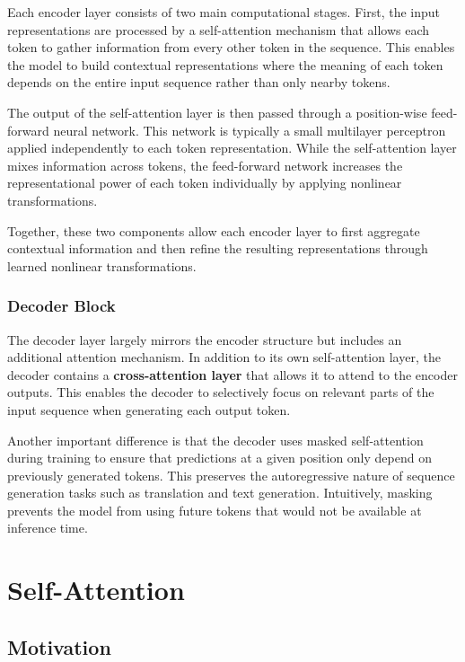 \documentclass[11pt]{article}
\begin{document}
Each encoder layer consists of two main computational stages. First, the input representations are processed by a self-attention mechanism that allows each token to gather information from every other token in the sequence. This enables the model to build contextual representations where the meaning of each token depends on the entire input sequence rather than only nearby tokens.

The output of the self-attention layer is then passed through a position-wise feed-forward neural network. This network is typically a small multilayer perceptron applied independently to each token representation. While the self-attention layer mixes information across tokens, the feed-forward network increases the representational power of each token individually by applying nonlinear transformations.

Together, these two components allow each encoder layer to first aggregate contextual information and then refine the resulting representations through learned nonlinear transformations.

\subsubsection{Decoder Block}

The decoder layer largely mirrors the encoder structure but includes an additional attention mechanism. In addition to its own self-attention layer, the decoder contains a \textbf{cross-attention layer} that allows it to attend to the encoder outputs. This enables the decoder to selectively focus on relevant parts of the input sequence when generating each output token.

Another important difference is that the decoder uses masked self-attention during training to ensure that predictions at a given position only depend on previously generated tokens. This preserves the autoregressive nature of sequence generation tasks such as translation and text generation. Intuitively, masking prevents the model from using future tokens that would not be available at inference time.

\section{Self-Attention}

\subsection{Motivation}
\end{document}
